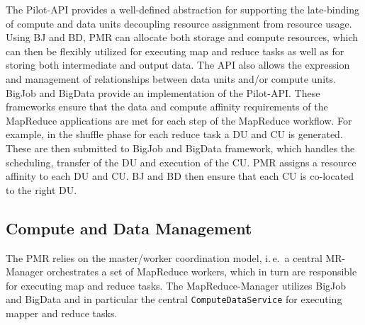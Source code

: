 \documentclass{acm_proc_article-sp}
\newcommand{\jhanote}[1]{ {\textcolor{red} { ***SJ: #1 }}}
\newcommand{\alnote}[1]{ {\textcolor{blue} { ***andreL: #1 }}}
\newcommand{\alnote}[1]{}
\newcommand{\jhanote}[1]{}
\newcommand{\upp}{\vspace*{-0.5em}}
\begin{document}
The Pilot-API provides a well-defined abstraction for supporting the
late-binding of compute and data units decoupling resource assignment
from resource usage. Using BJ and BD, PMR can allocate both storage
and compute resources, which can then be flexibly utilized for
executing map and reduce tasks as well as for storing both
intermediate and output data. %
The API also allows the expression and management of relationships
between data units and/or compute units. BigJob and BigData provide an
implementation of the Pilot-API. These frameworks ensure that the data
and compute affinity requirements of the MapReduce applications are
met for each step of the MapReduce workflow. For example, in the
shuffle phase for each reduce task a DU and CU is generated. These are
then submitted to BigJob and BigData framework, which handles the
scheduling, transfer of the DU and execution of the CU. PMR assigns a
resource affinity to each DU and CU. BJ and BD then ensure that each
CU is co-located to the right DU.

\upp
\subsection{Compute and Data Management}
The PMR relies on the master/worker coordination model, i.\,e.\ a
central MR-Manager orchestrates a set of
MapReduce workers, which in turn are responsible for executing map and
reduce tasks. The MapReduce-Manager utilizes BigJob and BigData and in 
particular the central \texttt{ComputeDataService} for executing
mapper and reduce tasks. %

% 
\end{document}
